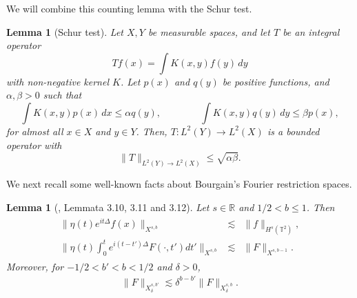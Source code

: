 \documentclass[11pt, xcolor = dvipsnames,reqno
]{amsart}
\newtheorem{lem}[thm]{Lemma}
\theoremstyle{definition}
\theoremstyle{remark}
\begin{document}
We will combine this counting lemma with the Schur test.  

\begin{lem}[Schur test]\label{lemma:schur-test}
Let $X, Y$ be measurable spaces,
and let $T$ be an integral operator 
\begin{equation}
    Tf(x) = \int K(x,y) f(y) \, dy
\end{equation}
with non-negative kernel $K$.
Let $p(x)$ and $q(y)$ be positive functions, and $\alpha, \beta > 0$ such that 
\begin{equation}\label{eq:hyp-schur}
    \int K(x,y) p(x) \, dx \leq \alpha q(y), 
    \qquad \qquad 
    \int K(x,y) q(y) \, dy \leq \beta p(x), 
\end{equation}
for almost all $x\in X$ and $y \in Y$. Then, $T: L^2(Y) \to L^2(X)$ is a bounded operator with
\begin{equation}
    \lVert T \rVert_{L^2(Y) \to L^2(X)} \leq \sqrt{\alpha \beta}.
\end{equation}
\end{lem}

We next recall some well-known facts about Bourgain's Fourier restriction spaces. 
	
\begin{lem}[\cite{ErdoganTzirakis2016}, Lemmata 3.10, 3.11 and 3.12]
\label{lemma:pre-rest-spaces}
    Let $s \in \mathbb{R}$ and $1/2 < b \leq 1$.  Then
    \begin{align*}
        \begin{array}{rcl}
                \|\eta(t) e^{it\Delta} f(x) \|_{X^{s,b}} & \lesssim & \|f\|_{H^s(\mathbb{T}^2)}, \\
                \displaystyle \Big\| \eta(t) \int_0^t e^{i(t - t')\Delta} F(\cdot,t') dt' \Big\|_{X^{s,b}} & \lesssim & \| F \|_{X^{s,b-1}}.
                \end{array}
        \end{align*}
        Moreover, for  $-1/2  < b' < b < 1/2$ and $\delta >0$, 
        \begin{align}
            \| F \|_{X^{s,b'}_{\delta}} \lesssim  \delta^{b-b'} \|F\|_{X^{s,b}_{\delta}}.
        \end{align}
    \end{lem}
\end{document}
